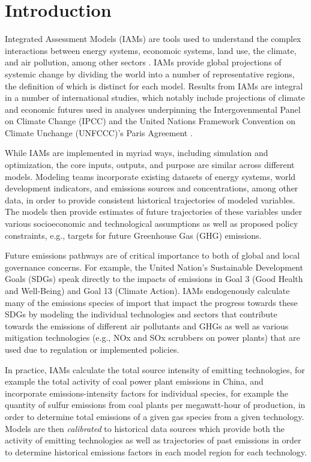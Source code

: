 \section{Introduction}

Integrated Assessment Models (IAMs) are tools used to understand the complex
interactions between energy systems, economoic systems, land use, the climate,
and air pollution, among other sectors \cite{van_vuuren_energy_2017,
  kriegler_fossil-fueled_2017, calvin_ssp4:_2017, fujimori_ssp3:_2017,
  fricko_marker_2017}. IAMs provide global projections of systemic change by
dividing the world into a number of representative regions, the definition of
which is distinct for each model. Results from IAMs are integral in a number of
international studies, which notably include projections of climate and economic
futures used in analyses underpinning the Intergovenmental Panel on Climate
Change (IPCC)  and the United Nations Framework Convention on Climate
Unchange (UNFCCC)'s Paris Agreement .

While IAMs are implemented in myriad ways, including simulation and
optimization, the core inputs, outputs, and purpose are similar across different
models. Modeling teams incorporate existing datasets of energy systems, world
development indicators, and emissions sources and concentrations, among other
data, in order to provide consistent historical trajectories of modeled
variables. The models then provide estimates of future trajectories of these
variables under various socioeconomic and technological assumptions as well as
proposed policy constraints, e.g., targets for future Greenhouse Gas (GHG)
emissions.

Future emissions pathways are of critical importance to both of global and local
governance concerns. For example, the United Nation's Sustainable Development
Goals (SDGs)  speak directly to the impacts of emissions in Goal 3
(Good Health and Well-Being) and Goal 13 (Climate Action). IAMs endogenously
calculate many of the emissions species of import that impact the progress
towards these SDGs by modeling the individual technologies and sectors that
contribute towards the emissions of different air pollutants and GHGs as well as
various mitigation technologies (e.g., NOx and SOx scrubbers on power plants)
that are used due to regulation or implemented policies.

In practice, IAMs calculate the total source intensity of emitting technologies,
for example the total activity of coal power plant emissions in China, and
incorporate emissions-intensity factors for individual species, for example the
quantity of sulfur emissions from coal plants per megawatt-hour of production,
in order to determine total emissions of a given gas species from a given
technology. Models are then \textit{calibrated} to historical data sources which
provide both the activity of emitting technologies as well as trajectories of
past emissions in order to determine historical emissions factors in each model
region for each technology.


